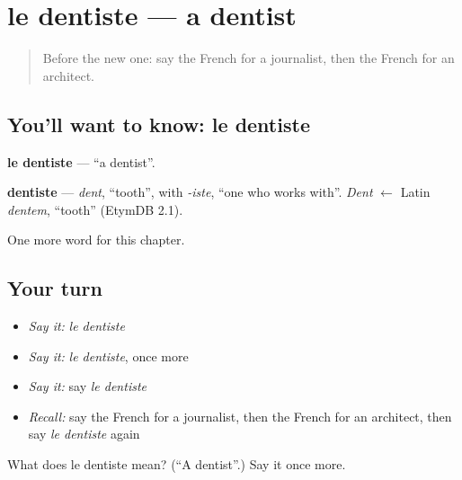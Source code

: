 \section[le dentiste]{le dentiste — a dentist}

\label{lesson:FR-C166-dentiste}



\begin{quote}
Before the new one: say the French for a journalist, then the French for an architect.
\end{quote}

\subsection*{You'll want to know: le dentiste}
\textbf{le dentiste} — \textquotedblleft{}a dentist\textquotedblright{}.

\begin{cousinweb}
\textbf{dentiste} — \emph{dent}, \textquotedblleft{}tooth\textquotedblright{}, with \emph{-iste}, \textquotedblleft{}one who works with\textquotedblright{}. \emph{Dent} $\leftarrow$ Latin \emph{dentem}, \textquotedblleft{}tooth\textquotedblright{} (EtymDB 2.1).
\end{cousinweb}

\begin{grammarlens}[title={What you've built}]
One more word for this chapter.
\end{grammarlens}

\subsection*{Your turn}
\begin{itemize}
\raggedright
  \item \emph{Say it:} \emph{le dentiste}
  \item \emph{Say it:} \emph{le dentiste}, once more
  \item \emph{Say it:} say \emph{le dentiste}
  \item \emph{Recall:} say the French for a journalist, then the French for an architect, then say \emph{le dentiste} again
\end{itemize}

\begin{tcolorbox}[breakable,colback=teal!4,colframe=teal!35!black,title={Before you move on}]
What does le dentiste mean? (\textquotedblleft{}A dentist\textquotedblright{}.) Say it once more.
\end{tcolorbox}
